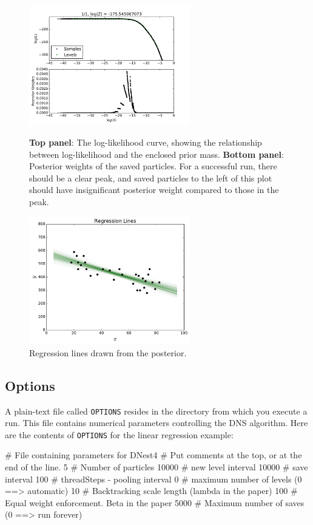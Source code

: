 \documentclass[article, nojss]{jss}
\begin{document}
\begin{figure}[ht!]
\begin{minipage}{7.5cm}
\includegraphics[width=7cm]{figures/fig3.pdf}
\caption{{\bf Top panel}: The log-likelihood curve, showing the relationship
between log-likelihood and the enclosed prior mass.
{\bf Bottom panel}: Posterior weights of the saved particles.
For a successful run, there should be a clear peak, and saved particles
to the left of this plot should have insignificant posterior weight compared
to those in the peak.
\label{fig:fig3}}
\end{minipage}\hspace{0.5cm}
\begin{minipage}{7.5cm}
\includegraphics[width=7cm]{figures/regression_lines.pdf}
\caption{Regression lines drawn from the posterior.
\label{fig:regression_lines}}
\end{minipage}
\end{figure}

\subsection{Options}\label{sec:options}
A plain-text file called {\tt OPTIONS} resides in the directory from which you
execute a run. This file contains numerical parameters controlling the
DNS algorithm. Here are the contents of {\tt OPTIONS} for the linear
regression example:

\begin{CodeChunk}
\begin{CodeInput}
# File containing parameters for DNest4
# Put comments at the top, or at the end of the line.
5       # Number of particles
10000   # new level interval
10000   # save interval
100     # threadSteps - pooling interval
0       # maximum number of levels (0 ==> automatic)
10      # Backtracking scale length (lambda in the paper)
100     # Equal weight enforcement. Beta in the paper
5000    # Maximum number of saves (0 ==> run forever)
\end{CodeInput}
\end{CodeChunk}
\end{document}
